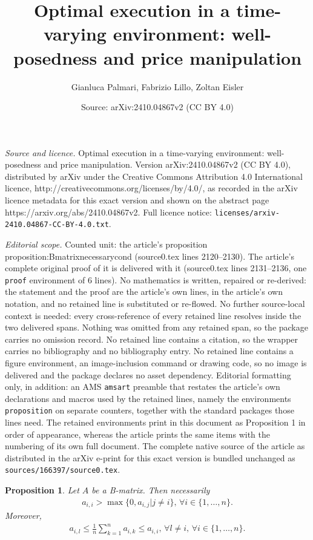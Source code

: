 \documentclass[10pt,a4paper]{amsart}
\title{Optimal execution in a time-varying environment: well-posedness and price manipulation}
\author{Gianluca Palmari, Fabrizio Lillo, Zoltan Eisler}
\date{Source: arXiv:2410.04867v2 (CC BY 4.0)}
\newtheorem{proposition}{Proposition}
\begin{document}
\maketitle

\noindent\emph{Source and licence.} Optimal execution in a time-varying environment: well-posedness and price manipulation. Version arXiv:2410.04867v2 (CC BY 4.0), distributed by arXiv under the Creative Commons Attribution 4.0 International licence, http://creativecommons.org/licenses/by/4.0/, as recorded in the arXiv licence metadata for this exact version and shown on the abstract page https://arxiv.org/abs/2410.04867v2. Full licence notice: \texttt{licenses/arxiv-2410.04867-CC-BY-4.0.txt}.\par\smallskip

\noindent\textit{Editorial scope.} Counted unit: the article's proposition proposition:Bmatrixnecessarycond (source0.tex lines 2120--2130). The article's complete original proof of it is delivered with it (source0.tex lines 2131--2136, one \texttt{proof} environment of 6 lines). No mathematics is written, repaired or re-derived: the statement and the proof are the article's own lines, in the article's own notation, and no retained line is substituted or re-flowed.  No further source-local context is needed: every cross-reference of every retained line resolves inside the two delivered spans.  Nothing was omitted from any retained span, so the package carries no omission record.  No retained line contains a citation, so the wrapper carries no bibliography and no bibliography entry.  No retained line contains a figure environment, an image-inclusion command or drawing code, so no image is delivered and the package declares no asset dependency.  Editorial formatting only, in addition: an AMS \texttt{amsart} preamble that restates the article's own declarations and macros used by the retained lines, namely the environments \texttt{proposition} on separate counters, together with the standard packages those lines need.  The retained environments print in this document as Proposition 1 in order of appearance, whereas the article prints the same items with the numbering of its own full document.  The complete native source of the article as distributed in the arXiv e-print for this exact version is bundled unchanged as \texttt{sources/166397/source0.tex}.
\begin{proposition}
\label{proposition:Bmatrixnecessarycond}
    Let $A$ be a B-matrix. Then necessarily 
    \begin{eqnarray}
        a_{i,i} > \max\{0,a_{i,j}|j\neq i\} \text{, } \forall i \in \{1,\dots,n\}.
    \end{eqnarray}
    Moreover, 
    \begin{eqnarray}
        a_{i,l} \le \frac{1}{n}\sum_{k=1}^{n}a_{i,k} \le a_{i,i} \text{, } \forall l\neq i\text{, }\forall i \in \{1,\dots,n\}.
    \end{eqnarray}
\end{proposition}
\end{document}
